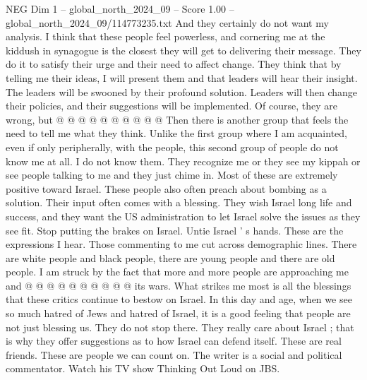 \begin{textsample}{NEG Dim 1 – global\_north\_2024\_09 – Score 1.00 – global\_north\_2024\_09/114773235.txt}
And they certainly do not want my analysis.
I think that these people feel powerless, and cornering me at the kiddush in synagogue is the closest they will get to delivering their message.
They do it to satisfy their urge and their need to affect change.
They think that by telling me their ideas, I will present them and that leaders will hear their insight.
The leaders will be swooned by their profound solution.
Leaders will then change their policies, and their suggestions will be implemented.
Of course, they are wrong, but @ @ @ @ @ @ @ @ @ @ Then there is another group that feels the need to tell me what they think.
Unlike the first group where I am acquainted, even if only peripherally, with the people, this second group of people do not know me at all.
I do not know them.
They recognize me or they see my kippah or see people talking to me and they just chime in.
Most of these are extremely positive toward Israel.
These people also often preach about bombing as a solution.
Their input often comes with a blessing.
They wish Israel long life and success, and they want the US administration to let Israel solve the issues as they see fit.
Stop putting the brakes on Israel.
Untie Israel ' s hands.
These are the expressions I hear.
Those commenting to me cut across demographic lines.
There are white people and black people, there are young people and there are old people.
I am struck by the fact that more and more people are approaching me and @ @ @ @ @ @ @ @ @ @ its wars.
What strikes me most is all the blessings that these critics continue to bestow on Israel.
In this day and age, when we see so much hatred of Jews and hatred of Israel, it is a good feeling that people are not just blessing us.
They do not stop there.
They really care about Israel ; that is why they offer suggestions as to how Israel can defend itself.
These are real friends.
These are people we can count on.
The writer is a social and political commentator.
Watch his TV show Thinking Out Loud on JBS.

\end{textsample}
